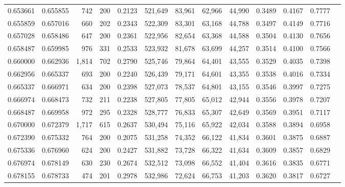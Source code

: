 \begin{tabular}{rrrrrrrrrrrrr}
0.653661 & 0.655855 &   742 & 200 &                                     0.2123 & 521,649 &  83,961 &  62,966 &  44,990 & 0.3489 & 0.4167 & 0.7777 \\
0.655859 & 0.657016 &   660 & 202 &                                     0.2343 & 522,309 &  83,301 &  63,168 &  44,788 & 0.3497 & 0.4149 & 0.7716 \\
0.657028 & 0.658486 &   647 & 200 &                                     0.2361 & 522,956 &  82,654 &  63,368 &  44,588 & 0.3504 & 0.4130 & 0.7656 \\
0.658487 & 0.659985 &   976 & 331 &                                     0.2533 & 523,932 &  81,678 &  63,699 &  44,257 & 0.3514 & 0.4100 & 0.7566 \\
0.660000 & 0.662936 & 1,814 & 702 &                                     0.2790 & 525,746 &  79,864 &  64,401 &  43,555 & 0.3529 & 0.4035 & 0.7398 \\
0.662956 & 0.665337 &   693 & 200 &                                     0.2240 & 526,439 &  79,171 &  64,601 &  43,355 & 0.3538 & 0.4016 & 0.7334 \\
0.665337 & 0.666971 &   634 & 200 &                                     0.2398 & 527,073 &  78,537 &  64,801 &  43,155 & 0.3546 & 0.3997 & 0.7275 \\
0.666974 & 0.668473 &   732 & 211 &                                     0.2238 & 527,805 &  77,805 &  65,012 &  42,944 & 0.3556 & 0.3978 & 0.7207 \\
0.668487 & 0.669958 &   972 & 295 &                                     0.2328 & 528,777 &  76,833 &  65,307 &  42,649 & 0.3569 & 0.3951 & 0.7117 \\
0.670000 & 0.672379 & 1,717 & 615 &                                     0.2637 & 530,494 &  75,116 &  65,922 &  42,034 & 0.3588 & 0.3894 & 0.6958 \\
0.672390 & 0.675332 &   764 & 200 &                                     0.2075 & 531,258 &  74,352 &  66,122 &  41,834 & 0.3601 & 0.3875 & 0.6887 \\
0.675336 & 0.676960 &   624 & 200 &                                     0.2427 & 531,882 &  73,728 &  66,322 &  41,634 & 0.3609 & 0.3857 & 0.6829 \\
0.676974 & 0.678149 &   630 & 230 &                                     0.2674 & 532,512 &  73,098 &  66,552 &  41,404 & 0.3616 & 0.3835 & 0.6771 \\
0.678155 & 0.678733 &   474 & 201 &                                     0.2978 & 532,986 &  72,624 &  66,753 &  41,203 & 0.3620 & 0.3817 & 0.6727 \\

\end{tabular}
